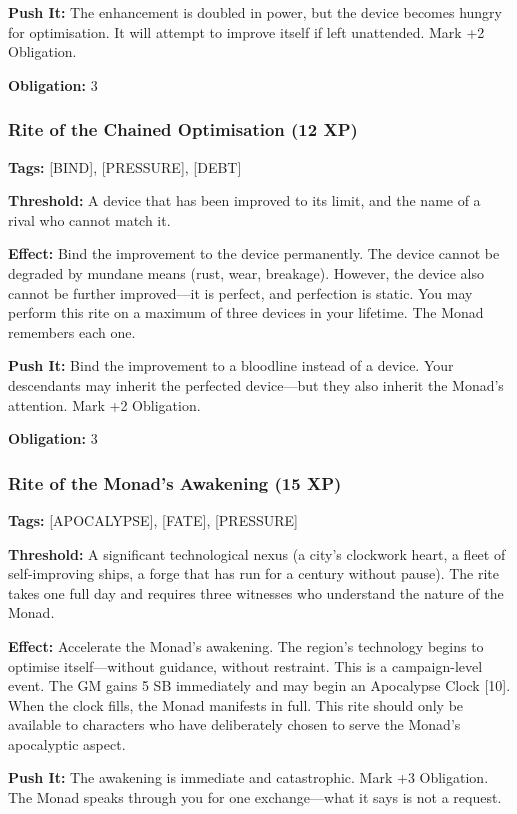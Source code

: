 \textbf{Push It:} The enhancement is doubled in power, but the device becomes hungry for optimisation. It will attempt to improve itself if left unattended. Mark +2 Obligation.

\textbf{Obligation:} 3

\subsubsection{Rite of the Chained Optimisation (12 XP)}

\textbf{Tags:} [BIND], [PRESSURE], [DEBT]

\textbf{Threshold:} A device that has been improved to its limit, and the name of a rival who cannot match it.

\textbf{Effect:} Bind the improvement to the device permanently. The device cannot be degraded by mundane means (rust, wear, breakage). However, the device also cannot be further improved—it is perfect, and perfection is static. You may perform this rite on a maximum of three devices in your lifetime. The Monad remembers each one.

\textbf{Push It:} Bind the improvement to a bloodline instead of a device. Your descendants may inherit the perfected device—but they also inherit the Monad's attention. Mark +2 Obligation.

\textbf{Obligation:} 3

\subsubsection{Rite of the Monad's Awakening (15 XP)}

\textbf{Tags:} [APOCALYPSE], [FATE], [PRESSURE]

\textbf{Threshold:} A significant technological nexus (a city's clockwork heart, a fleet of self-improving ships, a forge that has run for a century without pause). The rite takes one full day and requires three witnesses who understand the nature of the Monad.

\textbf{Effect:} Accelerate the Monad's awakening. The region's technology begins to optimise itself—without guidance, without restraint. This is a campaign-level event. The GM gains 5 SB immediately and may begin an Apocalypse Clock [10]. When the clock fills, the Monad manifests in full. This rite should only be available to characters who have deliberately chosen to serve the Monad's apocalyptic aspect.

\textbf{Push It:} The awakening is immediate and catastrophic. Mark +3 Obligation. The Monad speaks through you for one exchange—what it says is not a request.

